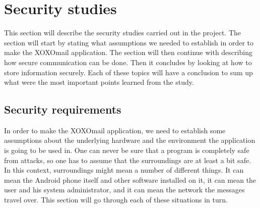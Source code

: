 \section{Security studies}\label{sec:seqreq}

This section will describe the security studies carried out in the project. The section will start by stating what assumptions we needed to establish in order to make the XOXOmail application. The section will then continue with describing how secure communication can be done. Then it concludes by looking at how to store information securely. Each of these topics will have a conclusion to sum up what were the most important points learned from the study.

\subsection{Security requirements}


In order to make the XOXOmail application, we need to establish some assumptions about the underlying hardware and the environment the application is going to be used in. One can never be sure that a program is completely safe from attacks, so one has to assume that the surroundings are at least a bit safe. In this context, surroundings might mean a number of different things. It can mean the Android phone itself and other software installed on it, it can mean the user and his system administrator, and it can mean the network the messages travel over. This section will go through each of these situations in turn.

\newpage

